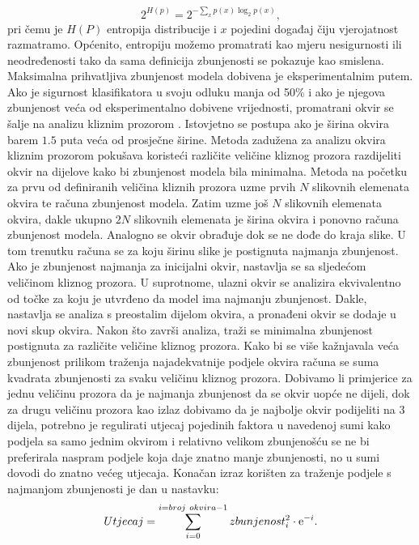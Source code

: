 \documentclass[times, utf8, diplomski]{fer}
\theoremstyle{definition}
\begin{document}
\begin{equation}
2^{H(p)} = 2 ^ {- \sum_{x}^{}p(x)\log_{2}p(x)},
\end{equation}
pri čemu je $H(P)$ entropija distribucije i $x$ pojedini događaj čiju vjerojatnost razmatramo. Općenito, entropiju možemo promatrati kao mjeru nesigurnosti ili neodređenosti tako da sama definicija zbunjenosti se pokazuje kao smislena. Maksimalna prihvatljiva zbunjenost modela dobivena je eksperimentalnim putem. Ako je sigurnost klasifikatora u svoju odluku manja od 50\% i ako je njegova zbunjenost veća od eksperimentalno dobivene vrijednosti, promatrani okvir se šalje na analizu kliznim prozorom . Istovjetno se postupa ako je širina okvira barem $1.5$ puta veća od prosječne širine.
\newline
Metoda zadužena za analizu okvira kliznim prozorom pokušava koristeći različite veličine kliznog prozora razdijeliti okvir na dijelove kako bi zbunjenost modela bila minimalna. Metoda na početku za prvu od definiranih veličina kliznih prozora uzme prvih $N$ slikovnih elemenata okvira te računa zbunjenost modela. Zatim uzme još $N$ slikovnih elemenata okvira, dakle ukupno $2N$ slikovnih elemenata je širina okvira i ponovno računa zbunjenost modela. Analogno se okvir obrađuje dok se ne dođe do kraja slike. U tom trenutku računa se za koju širinu slike je postignuta najmanja zbunjenost. Ako je zbunjenost najmanja za inicijalni okvir, nastavlja se sa sljedećom veličinom kliznog prozora. U suprotnome, ulazni okvir se analizira ekvivalentno od točke za koju je utvrđeno da model ima najmanju zbunjenost. Dakle, nastavlja se analiza s preostalim dijelom okvira, a pronađeni okvir se dodaje u novi skup okvira. Nakon što završi analiza, traži se minimalna zbunjenost postignuta za različite veličine kliznog prozora. Kako bi se više kažnjavala veća zbunjenost prilikom traženja najadekvatnije podjele okvira računa se suma kvadrata zbunjenosti za svaku veličinu kliznog prozora. Dobivamo li primjerice za jednu veličinu prozora da je najmanja zbunjenost da se okvir uopće ne dijeli, dok za drugu veličinu prozora kao izlaz dobivamo da je najbolje okvir podijeliti na 3 dijela, potrebno je regulirati utjecaj pojedinih faktora u navedenoj sumi kako podjela sa samo jednim okvirom i relativno velikom zbunjenošću se ne bi preferirala naspram podjele koja daje znatno manje zbunjenosti, no u sumi dovodi do znatno većeg utjecaja. Konačan izraz korišten za traženje podjele s najmanjom zbunjenosti je dan u nastavku:
\begin{equation}
Utjecaj = \sum_{i = 0}^{i = broj\ okvira - 1} zbunjenost_{i}^2 \cdot  {\rm e}^{-i}.
\end{equation}
\end{document}
